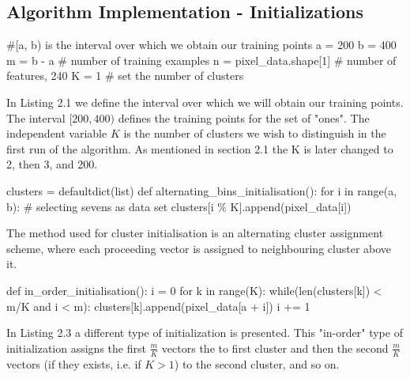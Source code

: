 \documentclass[a4paper, 11pt]{report}
\begin{document}
\subsection{Algorithm Implementation - Initializations}
\begin{python}[caption=Set up parameters]
#[a, b) is the interval over which we obtain our training points
a = 200
b = 400
m = b - a # number of training examples
n = pixel_data.shape[1] # number of features, 240
K = 1 # set the number of clusters
\end{python}
In Listing 2.1 we define the interval over which we will obtain our training points. The interval $[200, 400)$ defines the training points for the set of "ones". The independent variable $K$ is the number of clusters we wish to distinguish in the first run of the algorithm. As mentioned in section 2.1 the K is later changed to 2, then 3, and 200.\\

\begin{python}[caption= Alternating cluster initialization]
clusters = defaultdict(list)
def alternating_bins_initialisation():
    for i in range(a, b): # selecting sevens as data set
        clusters[i \% K].append(pixel_data[i])
\end{python}
The method used for cluster initialisation is an alternating cluster assignment scheme, where each proceeding vector is assigned to neighbouring cluster above it.

\begin{python}[caption=In order initialization]
def in_order_initialisation():
    i = 0
    for k in range(K):
        while(len(clusters[k]) < m/K and i < m):
            clusters[k].append(pixel_data[a + i])
            i += 1
\end{python}
In Listing 2.3 a different type of initialization is presented. This "in-order" type of initialization assigns the first $\frac{m}{K}$ vectors the to first cluster and then the second $\frac{m}{K}$ vectors (if they exists, i.e. if $K>1$) to the second cluster, and so on.
\end{document}
